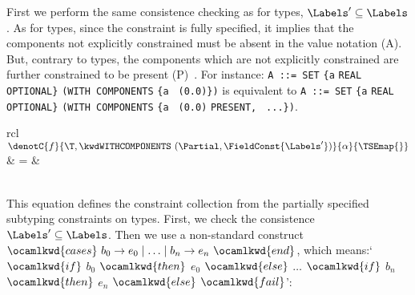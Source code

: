 \medskip

First we perform the same consistence checking as for \kwdCHOICE{}
types, $\Labels' \subseteq \Labels$. As for \kwdCHOICE{} types, since
the constraint is fully specified, it implies that the components not
explicitly constrained must be absent in the value notation
(A). But, contrary to \kwdCHOICE{} types, the components which are
not explicitly constrained are further constrained to be present
(P)~\cite[\S{47.8.9.3}]{X.680:2002}. For instance: \texttt{\small A
::= SET} \verb+{+\texttt{a} \texttt{\small REAL OPTIONAL}\verb+}+
\texttt{\small (WITH COMPONENTS} \verb+{+\texttt{a} \texttt{\small
(0.0)}\verb+}+\texttt{\small )} is equivalent to \texttt{\small A ::=
SET} \verb+{+\texttt{a} \texttt{\small REAL OPTIONAL}\verb+}+
\texttt{\small (WITH COMPONENTS} \verb+{+\texttt{a} \texttt{\small
(0.0)} \texttt{\small PRESENT,} \texttt{\small
...}\verb+}+\texttt{\small )}.

\medskip

\noindent
\begin{tabular}{rcl}
    $\denotC{f}{\T, \kwdWITHCOMPONENTS \,\, (\Partial,
     \FieldConst{\Labels'})}{\alpha}{\TSEmap{}}$
  & \hspace*{-4mm} = &\\
    \\
\end{tabular}%

\medskip

This equation defines the constraint collection from the partially
specified subtyping constraints on \kwdCHOICE{} types.  First, we
check the consistence $\Labels' \subseteq \Labels$. Then we use a
non-standard construct $\ocamlkwd{cases} \,\, b_0 \rightarrow e_0 \mid
\ldots \mid b_n \rightarrow e_n \,\, \ocamlkwd{end}$, which
means:`$\ocamlkwd{if}$ $b_0$ $\ocamlkwd{then}$ $e_0$ $\ocamlkwd{else}$
$\ldots$ $\ocamlkwd{if}$ $b_n$ $\ocamlkwd{then}$ $e_n$
$\ocamlkwd{else}$ $\ocamlkwd{fail}$':

\medskip

